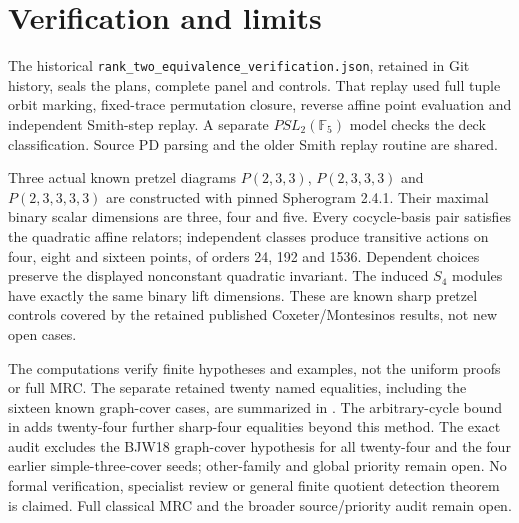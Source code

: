 \documentclass[11pt]{article}
\newcommand{\F}{\mathbb F}
\begin{document}
\section{Verification and limits}

The historical \texttt{rank\_two\_equivalence\_verification.json},
retained in Git history, seals the plans, complete panel and controls.
That replay used full tuple
orbit marking, fixed-trace permutation closure, reverse affine
point evaluation and independent Smith-step replay. A separate
$PSL_2(\F_5)$ model checks the deck classification. Source PD
parsing and the older Smith replay routine are shared.

Three actual known pretzel diagrams $P(2,3,3)$,
$P(2,3,3,3)$ and $P(2,3,3,3,3)$ are constructed with pinned
Spherogram 2.4.1. Their maximal binary scalar dimensions are
three, four and five. Every cocycle-basis pair satisfies the
quadratic affine relators; independent classes produce
transitive actions on four, eight and sixteen points, of
orders 24, 192 and 1536. Dependent choices preserve the
displayed nonconstant quadratic invariant. The induced $S_4$
modules have exactly the same binary lift dimensions. These
are known sharp pretzel controls covered by the retained
published Coxeter/Montesinos results, not new open cases.

The computations verify finite hypotheses and examples, not
the uniform proofs or full MRC. The separate retained twenty named
equalities, including the sixteen known graph-cover cases, are summarized
in .
The arbitrary-cycle bound in 
adds twenty-four further sharp-four equalities beyond this method.
The exact audit  excludes the BJW18
graph-cover hypothesis for all twenty-four and the four earlier
simple-three-cover seeds; other-family and global priority remain open.
No formal verification, specialist review or general finite
quotient detection theorem is claimed. Full classical MRC and
the broader source/priority audit remain open.
\end{document}
